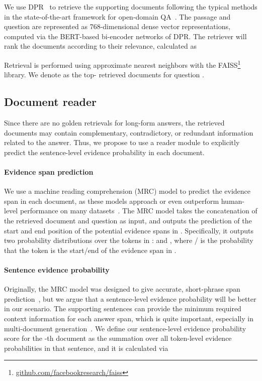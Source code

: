 \documentclass[11pt]{article}
\begin{document}
We use DPR~\cite{karpukhin2020dense} to retrieve the supporting documents following the typical methods in the state-of-the-art framework for open-domain QA~\cite{izacard2021leveraging,NEURIPS2020_6b493230}. The passage and question are represented as 768-dimensional dense vector representations, computed via the BERT-based bi-encoder networks of DPR. The retriever will rank the documents according to their relevance, calculated as
\setlength{\abovedisplayskip}{3pt}
\setlength{\belowdisplayskip}{3pt}


Retrieval is performed using approximate nearest neighbors with the FAISS\footnote{\url{github.com/facebookresearch/faiss}} library. We denote  as the top- retrieved documents for question . 



\subsection{Document reader}
Since there are no golden retrievals for long-form answers, the retrieved documents may contain complementary, contradictory, or redundant information related to the answer. Thus, we propose to use a reader module to explicitly predict the sentence-level evidence probability in each document.  


\paragraph{Evidence span prediction}
We use a machine reading comprehension (MRC) model to predict the evidence span in each document, as these models approach or even outperform human-level performance on many datasets~\cite{joshi2020spanbert}. The MRC model takes the concatenation of the retrieved document  and question  as input, and outputs the prediction of the start and end position of the potential evidence spans in . Specifically, it outputs two probability distributions over the tokens in :  and , where  /  is the probability that the token  is the start/end of the evidence span in . 



\vspace{3pt}

\paragraph{Sentence evidence probability}
Originally, the MRC model was designed to give accurate, short-phrase span prediction~\cite{rajpurkar2016squad}, but we argue that a sentence-level evidence probability will be better in our scenario. The supporting sentences can provide the minimum required context information for each answer span, which is quite important, especially in multi-document generation~\cite{xu2020coarse}. We define our sentence-level evidence probability score for the -th document  as the summation over all token-level evidence probabilities in that sentence, and it is calculated via
\end{document}
